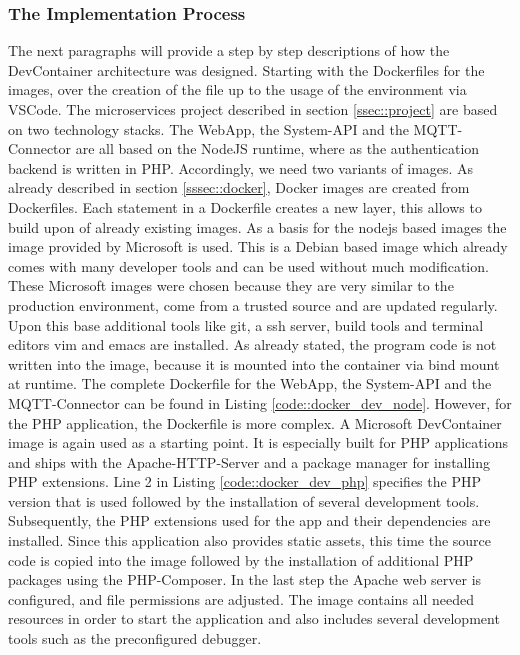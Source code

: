         \subsubsection{The Implementation Process}\label{ssec::imp_process}
        The next paragraphs will provide a step by step descriptions of how the DevContainer architecture was designed. Starting with the Dockerfiles for the images, over the creation of the  file up to the usage of the environment via \ac{VSCode}.
        The microservices project described in section \ref{ssec::project} are based on two technology stacks. The WebApp, the System-API and the MQTT-Connector are all based on the NodeJS runtime, where as the authentication backend is written in PHP. Accordingly, we need two variants of images. As already described in section \ref{sssec::docker}, Docker images are created from Dockerfiles. Each statement in a Dockerfile creates a new layer, this allows to build upon of already existing images.\newline
        As a basis for the nodejs based images the  image provided by Microsoft is used. This is a Debian based image which already comes with many developer tools and can be used without much modification. These Microsoft images were chosen because they are very similar to the production environment, come from a trusted source and are updated regularly. Upon this base additional tools like git, a ssh server, build tools and terminal editors vim and emacs are installed. As already stated, the program code is not written into the image, because it is mounted into the container via bind mount at runtime. The complete Dockerfile for the WebApp, the System-\ac{API} and the MQTT-Connector can be found in Listing \ref{code::docker_dev_node}.\newline
        However, for the PHP application, the Dockerfile is more complex. A Microsoft DevContainer image is again used as a starting point. It is especially built for PHP applications and ships with the Apache-\acs{HTTP}-Server and a package manager for installing PHP extensions. Line 2 in Listing \ref{code::docker_dev_php} specifies the PHP version that is used followed by the installation of several development tools. Subsequently, the PHP extensions used for the app and their dependencies are installed. Since this application also provides static assets, this time the source code is copied into the image followed by the installation of additional PHP packages using the PHP-Composer. In the last step the Apache web server is configured, and file permissions are adjusted. The image contains all needed resources in order to start the application and also includes several development tools such as the preconfigured  debugger.\newline
